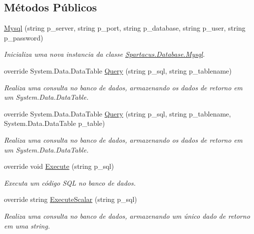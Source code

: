\subsection*{Métodos Públicos}
\begin{DoxyCompactItemize}
\item 
\hyperlink{classSpartacus_1_1Database_1_1Mysql_aa1a7b4639cb22e84da677a4186efa060}{Mysql} (string p\+\_\+server, string p\+\_\+port, string p\+\_\+database, string p\+\_\+user, string p\+\_\+password)
\begin{DoxyCompactList}\small\item\em Inicializa uma nova instancia da classe \hyperlink{classSpartacus_1_1Database_1_1Mysql}{Spartacus.\+Database.\+Mysql}. \end{DoxyCompactList}\item 
override System.\+Data.\+Data\+Table \hyperlink{classSpartacus_1_1Database_1_1Mysql_a3546716a22fd53251603f2ab36d34410}{Query} (string p\+\_\+sql, string p\+\_\+tablename)
\begin{DoxyCompactList}\small\item\em Realiza uma consulta no banco de dados, armazenando os dados de retorno em um System.\+Data.\+Data\+Table. \end{DoxyCompactList}\item 
override System.\+Data.\+Data\+Table \hyperlink{classSpartacus_1_1Database_1_1Mysql_a2b7f2096a3ee819670c49ed41cf04f75}{Query} (string p\+\_\+sql, string p\+\_\+tablename, System.\+Data.\+Data\+Table p\+\_\+table)
\begin{DoxyCompactList}\small\item\em Realiza uma consulta no banco de dados, armazenando os dados de retorno em um System.\+Data.\+Data\+Table. \end{DoxyCompactList}\item 
override void \hyperlink{classSpartacus_1_1Database_1_1Mysql_afdef08fb8a30287e8c550798aa6b6742}{Execute} (string p\+\_\+sql)
\begin{DoxyCompactList}\small\item\em Executa um código S\+Q\+L no banco de dados. \end{DoxyCompactList}\item 
override string \hyperlink{classSpartacus_1_1Database_1_1Mysql_ac6d8b14aed570a1a740481a0720620ab}{Execute\+Scalar} (string p\+\_\+sql)
\begin{DoxyCompactList}\small\item\em Realiza uma consulta no banco de dados, armazenando um único dado de retorno em uma string. \end{DoxyCompactList}\end{DoxyCompactItemize}

